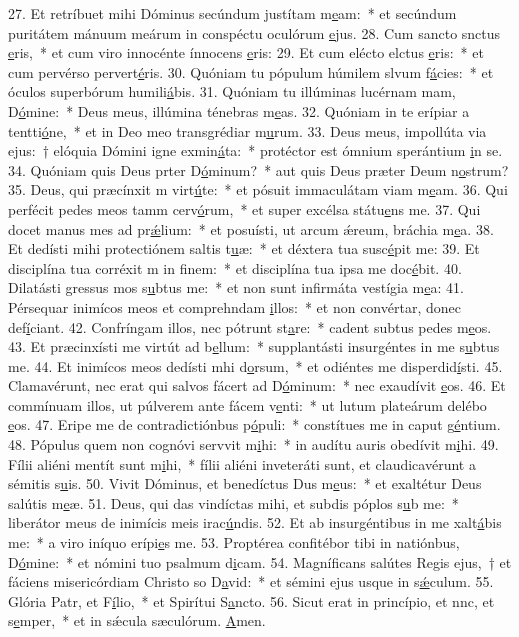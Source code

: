 27. Et retríbuet mihi Dóminus secúndum justítam m\uline{e}am:~* et secúndum puritátem mánuum meárum in conspéctu oculórum \uline{e}jus.
28. Cum sancto snctus \uline{e}ris,~* et cum viro innocénte ínnocens \uline{e}ris:
29. Et cum elécto elctus \uline{e}ris:~* et cum pervérso pervert\uline{é}ris.
30. Quóniam tu pópulum húmilem slvum f\uline{á}cies:~* et óculos superbórum humili\uline{á}bis.
31. Quóniam tu illúminas lucérnam mam, D\uline{ó}mine:~* Deus meus, illúmina ténebras m\uline{e}as.
32. Quóniam in te erípiar a tentti\uline{ó}ne,~* et in Deo meo transgrédiar m\uline{u}rum.
33. Deus meus, impollúta via ejus:~† elóquia Dómini igne exmin\uline{á}ta:~* protéctor est ómnium sperántium \uline{i}n se.
34. Quóniam quis Deus prter D\uline{ó}minum?~* aut quis Deus præter Deum n\uline{o}strum?
35. Deus, qui præcínxit m virt\uline{ú}te:~* et pósuit immaculátam viam m\uline{e}am.
36. Qui perfécit pedes meos tamm cerv\uline{ó}rum,~* et super excélsa státu\uline{e}ns me.
37. Qui docet manus mes ad pr\uline{ǽ}lium:~* et posuísti, ut arcum ǽreum, bráchia m\uline{e}a.
38. Et dedísti mihi protectiónem saltis t\uline{u}æ:~* et déxtera tua susc\uline{é}pit me:
39. Et disciplína tua corréxit m in f\uline{i}nem:~* et disciplína tua ipsa me doc\uline{é}bit.
40. Dilatásti gressus mos s\uline{u}btus me:~* et non sunt infirmáta vestígia m\uline{e}a:
41. Pérsequar inimícos meos et comprehndam \uline{i}llos:~* et non convértar, donec def\uline{í}ciant.
42. Confríngam illos, nec pótrunt st\uline{a}re:~* cadent subtus pedes m\uline{e}os.
43. Et præcinxísti me virtút ad b\uline{e}llum:~* supplantásti insurgéntes in me s\uline{u}btus me.
44. Et inimícos meos dedísti mhi d\uline{o}rsum,~* et odiéntes me disperdid\uline{í}sti.
45. Clamavérunt, nec erat qui salvos fácert ad D\uline{ó}minum:~* nec exaudívit \uline{e}os.
46. Et commínuam illos, ut púlverem ante fácem v\uline{e}nti:~* ut lutum plateárum delébo \uline{e}os.
47. Eripe me de contradictiónbus p\uline{ó}puli:~* constítues me in caput g\uline{é}ntium.
48. Pópulus quem non cognóvi servvit m\uline{i}hi:~* in audítu auris obedívit m\uline{i}hi.
49. Fílii aliéni mentít sunt m\uline{i}hi,~* fílii aliéni inveteráti sunt, et claudicavérunt a sémitis s\uline{u}is.
50. Vivit Dóminus, et benedíctus Dus m\uline{e}us:~* et exaltétur Deus salútis m\uline{e}æ.
51. Deus, qui das vindíctas mihi, et subdis póplos s\uline{u}b me:~* liberátor meus de inimícis meis irac\uline{ú}ndis.
52. Et ab insurgéntibus in me xalt\uline{á}bis me:~* a viro iníquo erípi\uline{e}s me.
53. Proptérea confitébor tibi in natiónbus, D\uline{ó}mine:~* et nómini tuo psalmum d\uline{i}cam.
54. Magníficans salútes Regis ejus,~† et fáciens misericórdiam Christo so D\uline{a}vid:~* et sémini ejus usque in s\uline{ǽ}culum.
55. Glória Patr, et F\uline{í}lio,~* et Spirítui S\uline{a}ncto.
56. Sicut erat in princípio, et nnc, et s\uline{e}mper,~* et in sǽcula sæculórum. \uline{A}men.

